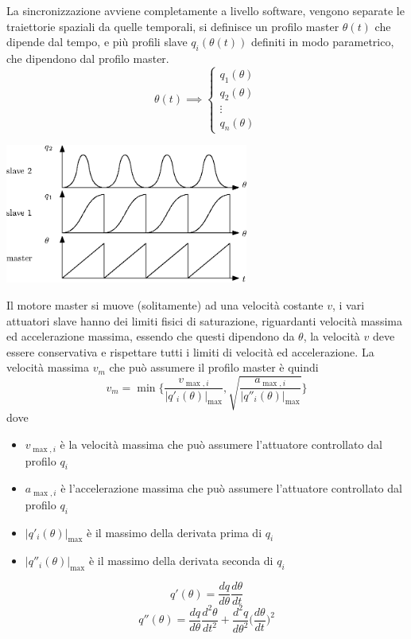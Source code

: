 \documentclass[10pt, letterpaper]{report}
\begin{document}
La sincronizzazione avviene completamente a livello software, vengono separate le traiettorie spaziali da quelle temporali, si definisce un profilo master $\theta(t)$ che dipende dal tempo, e più profili slave $q_i(\theta(t))$ definiti in modo parametrico, che dipendono dal profilo master.
$$ \theta(t)\implies \begin{cases}
    q_1(\theta)\\ 
    q_2(\theta)\\ 
    \vdots \\ 
    q_n(\theta)
\end{cases}$$
\begin{center}
    \includegraphics[width=0.6\textwidth]{images/masterSlave2.eps}
\end{center}
Il motore master si muove (solitamente) ad una velocità costante $v$, i vari attuatori slave hanno dei limiti fisici di saturazione, riguardanti velocità massima ed accelerazione massima, essendo che questi dipendono da $\theta$, la velocità $v$ deve essere conservativa e rispettare tutti i limiti di velocità ed accelerazione. La velocità massima $v_m$ che può assumere il profilo master è quindi 
$$ v_m=\min\Big\{    
\frac{v_{\max,i}}{|q'_i(\theta)|_{\max}}, 
\sqrt{\frac{a_{\max,i}}{|q''_i(\theta)|_{\max}} }
\Big\}$$
dove\begin{itemize}
    \item $v_{\max,i}$ è la velocità massima che può assumere l'attuatore controllato dal profilo $q_i$ 
    \item $a_{\max,i}$ è l'accelerazione massima che può assumere l'attuatore controllato dal profilo $q_i$ 
    \item $|q'_i(\theta)|_{\max}$ è il massimo della derivata prima di $q_i$
    \item $|q''_i(\theta)|_{\max}$ è il massimo della derivata seconda di $q_i$
\end{itemize}
$$q'(\theta)=\frac{dq}{d\theta}\frac{d\theta}{dt}$$
$$q''(\theta)=\frac{dq}{d\theta}\frac{d^2\theta}{dt^2}+\frac{d^2q}{d\theta^2}\big(\frac{d\theta}{dt}\big)^2$$
\end{document}
